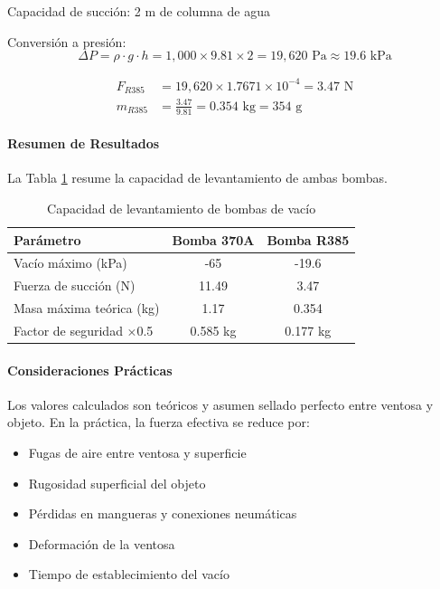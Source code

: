 Capacidad de succión: 2 m de columna de agua

Conversión a presión:
\begin{equation}
\Delta P = \rho \cdot g \cdot h = 1{,}000 \times 9.81 \times 2 = 19{,}620 \text{ Pa} \approx 19.6 \text{ kPa}
\end{equation}

\begin{align}
F_{R385} &= 19{,}620 \times 1.7671 \times 10^{-4} = 3.47 \text{ N} \\
m_{R385} &= \frac{3.47}{9.81} = 0.354 \text{ kg} = 354 \text{ g}
\end{align}

\paragraph{Resumen de Resultados}

La Tabla \ref{tab:capacidad_levantamiento} resume la capacidad de levantamiento de ambas bombas.

\begin{table}[H]
\centering
\caption{Capacidad de levantamiento de bombas de vacío}
\label{tab:capacidad_levantamiento}
\small
\begin{tabular}{|l|c|c|}
\hline
\textbf{Parámetro} & \textbf{Bomba 370A} & \textbf{Bomba R385} \\
\hline
Vacío máximo (kPa) & -65 & -19.6 \\
Fuerza de succión (N) & 11.49 & 3.47 \\
Masa máxima teórica (kg) & 1.17 & 0.354 \\
Factor de seguridad ×0.5 & 0.585 kg & 0.177 kg \\
\hline
\end{tabular}
\end{table}

\paragraph{Consideraciones Prácticas}

Los valores calculados son teóricos y asumen sellado perfecto entre ventosa y objeto. En la práctica, la fuerza efectiva se reduce por:

\begin{itemize}
    \item Fugas de aire entre ventosa y superficie
    \item Rugosidad superficial del objeto
    \item Pérdidas en mangueras y conexiones neumáticas
    \item Deformación de la ventosa
    \item Tiempo de establecimiento del vacío
\end{itemize}

